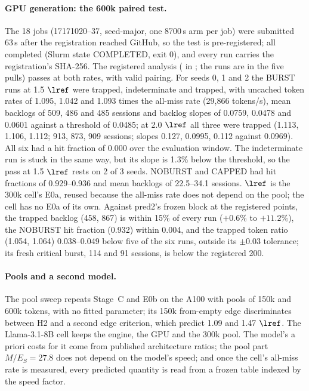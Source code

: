 \paragraph{GPU generation: the 600k paired test.} The 18 jobs (17171020--37, seed-major, one 8700\,s arm per job) were submitted 63\,s after the registration reached GitHub, so the test is pre-registered; all completed (Slurm state COMPLETED, exit 0), and every run carries the registration's SHA-256. The registered analysis ( in ; the runs are in the five  pulls) passes at both rates, with valid pairing. For seeds 0, 1 and 2 the BURST runs at 1.5 $\lref$ were trapped, indeterminate and trapped, with uncached token rates of 1.095, 1.042 and 1.093 times the all-miss rate (29,866 tokens/s), mean backlogs of 509, 486 and 485 sessions and backlog slopes of 0.0759, 0.0478 and 0.0601\sps{} against a threshold of 0.0485; at 2.0 $\lref$ all three were trapped (1.113, 1.106, 1.112; 913, 873, 909 sessions; slopes 0.127, 0.0995, 0.112 against 0.0969). All six had a hit fraction of 0.000 over the evaluation window. The indeterminate run is stuck in the same way, but its slope is 1.3\% below the threshold, so the pass at 1.5 $\lref$ rests on 2 of 3 seeds. NOBURST and CAPPED had hit fractions of 0.929--0.936 and mean backlogs of 22.5--34.1 sessions. $\lref$ is the 300k cell's E0a, reused because the all-miss rate does not depend on the pool; the cell has no E0a of its own. Against pred2's frozen block at the registered points, the trapped backlog (458, 867) is within 15\% of every run ($+0.6\%$ to $+11.2\%$), the NOBURST hit fraction (0.932) within 0.004, and the trapped token ratio (1.054, 1.064) 0.038--0.049 below five of the six runs, outside its $\pm0.03$ tolerance; its fresh critical burst, 114 and 91 sessions, is below the registered 200.

\paragraph{Pools and a second model.} The pool sweep repeats Stage~C and E0b on the A100 with pools of 150k and 600k tokens, with no fitted parameter; its 150k from-empty edge discriminates between H2 and a second edge criterion, which predict 1.09 and 1.47 $\lref$. The Llama-3.1-8B cell keeps the engine, the GPU and the 300k pool. The model's a priori costs for it come from published architecture ratios; the pool part $M/E_S=27.8$ does not depend on the model's speed; and once the cell's all-miss rate is measured, every predicted quantity is read from a frozen table indexed by the speed factor.

